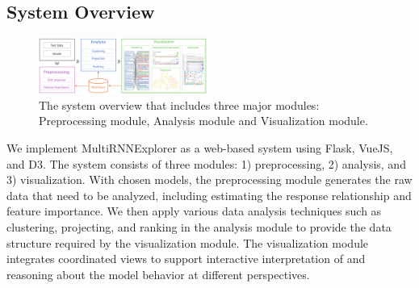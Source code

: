 
\subsection{System Overview}

\begin{figure}[t]
	\centering
    \includegraphics[width=0.49\textwidth]{pictures/System_framework.pdf}
	\vspace{-3mm}
	\caption{The system overview that includes three major modules: Preprocessing module, Analysis module and Visualization module. 
	}
	\label{fig:system_framework}
	\vspace{-4mm}
\end{figure}


We implement MultiRNNExplorer as a web-based system using Flask, VueJS, and D3. 
The system consists of three modules: 1) preprocessing, 2) analysis, and 3) visualization.
With chosen models, the preprocessing module generates the raw data that need to be analyzed, including estimating the response relationship and feature importance.
We then apply various data analysis techniques such as clustering, projecting, and ranking in the analysis module to provide the data structure required by the visualization module.
The visualization module integrates coordinated views to support interactive interpretation of and reasoning about the model behavior at different perspectives. 

